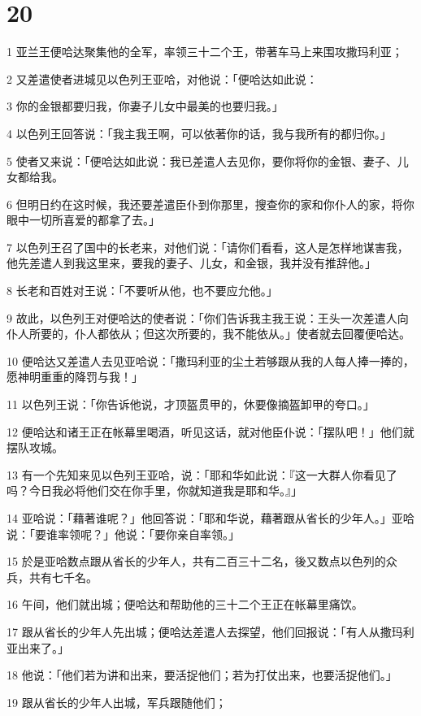 \chapter{20}

\par 1 亚兰王便哈达聚集他的全军，率领三十二个王，带著车马上来围攻撒玛利亚；
\par 2 又差遣使者进城见以色列王亚哈，对他说：「便哈达如此说：
\par 3 你的金银都要归我，你妻子儿女中最美的也要归我。」
\par 4 以色列王回答说：「我主我王啊，可以依著你的话，我与我所有的都归你。」
\par 5 使者又来说：「便哈达如此说：我已差遣人去见你，要你将你的金银、妻子、儿女都给我。
\par 6 但明日约在这时候，我还要差遣臣仆到你那里，搜查你的家和你仆人的家，将你眼中一切所喜爱的都拿了去。」
\par 7 以色列王召了国中的长老来，对他们说：「请你们看看，这人是怎样地谋害我，他先差遣人到我这里来，要我的妻子、儿女，和金银，我并没有推辞他。」
\par 8 长老和百姓对王说：「不要听从他，也不要应允他。」
\par 9 故此，以色列王对便哈达的使者说：「你们告诉我主我王说：王头一次差遣人向仆人所要的，仆人都依从；但这次所要的，我不能依从。」使者就去回覆便哈达。
\par 10 便哈达又差遣人去见亚哈说：「撒玛利亚的尘土若够跟从我的人每人捧一捧的，愿神明重重的降罚与我！」
\par 11 以色列王说：「你告诉他说，才顶盔贯甲的，休要像摘盔卸甲的夸口。」
\par 12 便哈达和诸王正在帐幕里喝酒，听见这话，就对他臣仆说：「摆队吧！」他们就摆队攻城。
\par 13 有一个先知来见以色列王亚哈，说：「耶和华如此说：『这一大群人你看见了吗？今日我必将他们交在你手里，你就知道我是耶和华。』」
\par 14 亚哈说：「藉著谁呢？」他回答说：「耶和华说，藉著跟从省长的少年人。」亚哈说：「要谁率领呢？」他说：「要你亲自率领。」
\par 15 於是亚哈数点跟从省长的少年人，共有二百三十二名，後又数点以色列的众兵，共有七千名。
\par 16 午间，他们就出城；便哈达和帮助他的三十二个王正在帐幕里痛饮。
\par 17 跟从省长的少年人先出城；便哈达差遣人去探望，他们回报说：「有人从撒玛利亚出来了。」
\par 18 他说：「他们若为讲和出来，要活捉他们；若为打仗出来，也要活捉他们。」
\par 19 跟从省长的少年人出城，军兵跟随他们；
